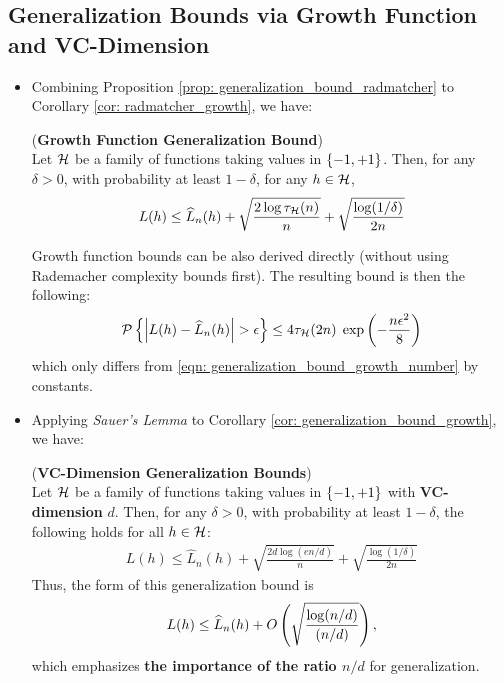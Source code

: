 \documentclass[11pt]{article}
\begin{document}
\subsection{Generalization Bounds via Growth Function and VC-Dimension}
\begin{itemize}
\item Combining Proposition \ref{prop: generalization_bound_radmatcher} to Corollary \ref{cor: radmatcher_growth}, we have:
\begin{corollary} \label{cor: generalization_bound_growth}   (\textbf{Growth Function Generalization Bound})  \citep{mohri2018foundations}\\
Let ${\mathcal H}$ be a family of functions taking values in $\left\{-1, +1\right\}$.  Then, for any $\delta > 0$, with probability at least $1 - \delta$, for any $h \in {\mathcal H}$,
\begin{align}
L(h) \le \widehat{L}_{n}(h) + \sqrt{\frac{2 \log \tau_{{\mathcal H}}(n)}{n}} +\sqrt{\frac{\log(1/\delta)}{2n}} \label{eqn: generalization_bound_growth_number}
\end{align}

Growth function bounds can be also derived directly (without using Rademacher complexity bounds first). The resulting bound is then the following:
\begin{align}
{\mathcal P}\left\{\left\lvert L(h) - \widehat{L}_{n}(h) \right\rvert > \epsilon \right\}  \le 4\tau_{{\mathcal H}}(2n)\;\exp\left(-\frac{n\epsilon^2}{8}\right) \label{eqn: generalization_bound_growth_number_2}
\end{align}
which only differs from \eqref{eqn: generalization_bound_growth_number} by constants.
\end{corollary}

\item Applying \emph{Sauer's Lemma} to Corollary \ref{cor: generalization_bound_growth}, we have:
\begin{corollary} \label{cor: generalization_bound_vc} (\textbf{VC-Dimension Generalization Bounds}) \citep{mohri2018foundations}\\
Let ${\mathcal H}$ be a family of functions taking values in $\left\{-1, +1\right\}$ with \textbf{VC-dimension} $d$. Then, for any $\delta > 0$, with probability at least $1 - \delta$, the following holds for all $h \in {\mathcal H}$:
\begin{align}
L(h) \le \widehat{L}_{n}(h) + \sqrt{\frac{2d \log(en /d)}{n}} +\sqrt{\frac{\log(1/\delta)}{2n}} \label{eqn: generalization_bound_vc_dim}
\end{align}
Thus, the form of this generalization bound is
\begin{align}
L(h) \le \widehat{L}_{n}(h) + O\left(\sqrt{\frac{\log(n /d)}{(n/d)}}\right),  \label{eqn: generalization_bound_vc_dim2}
\end{align}
which emphasizes \textbf{the importance of the ratio $n/d$} for generalization. 
\end{corollary}


\end{itemize}
\end{document}
